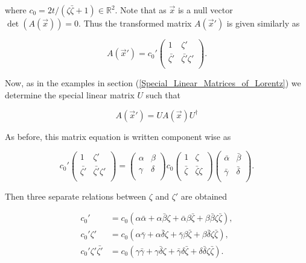 \noindent where $c_0 = 2t/(\zeta\bar{\zeta}+1) \in \mathbb{R}^2$. Note that as $\vec{x}$ is a null vector $\det{(A(\vec{x}))} = 0$. Thus the transformed matrix $A(\vec{x}')$ is given similarly as

\begin{equation*}
A(\vec{x}') = 
{c_0}'\left(
\begin{array}{cc}
1           & \zeta' \\ 
\bar{\zeta'} & \bar{\zeta'}\zeta' \\ 
\end{array}
\right).
\end{equation*}

\noindent Now, as in the examples in section (\ref{Special_Linear_Matrices_of_Lorentz}) we determine the special linear matrix $U$ such that

\begin{equation}\label{Ext_Complex_UAU}
A(\vec{x}') = U A(\vec{x}) U^{\dagger}
\end{equation}

\noindent As before, this matrix equation is written component wise as

\begin{equation*}
{c_0}'\left(
\begin{array}{cc}
1           & \zeta' \\ 
\bar{\zeta'} & \bar{\zeta'}\zeta' \\ 
\end{array}
\right)
=
\left(
\begin{array}{cc}
\alpha & \beta \\
\gamma & \delta \\
\end{array}
\right)
{c_0}\left(
\begin{array}{cc}
1           & \zeta \\ 
\bar{\zeta} & \bar{\zeta}\zeta \\ 
\end{array}
\right)
\left(
\begin{array}{cc}
\bar{\alpha} & \bar{\beta} \\
\bar{\gamma} & \bar{\delta} \\
\end{array}
\right).
\end{equation*}

\noindent Then three separate relations between $\zeta$ and $\zeta'$ are obtained

\begin{align}\label{Ext_Complex_zeta_trans_1} 
{c_0}' & = c_0 (\alpha \bar{\alpha} + \alpha \bar{\beta} \zeta + \bar{\alpha} \beta \bar{\zeta} + \beta \bar{\beta} \zeta \bar{\zeta}), \\\label{Ext_Complex_zeta_trans_2} 
{c_0}'\zeta' & = c_0 (\alpha \bar{\gamma} + \alpha \bar{\delta} \zeta + \bar{\gamma} \beta \bar{\zeta} + \beta \bar{\delta} \zeta \bar{\zeta}), \\\label{Ext_Complex_zeta_trans_3} 
{c_0}'\zeta'\bar{\zeta'} & = c_0 (\gamma \bar{\gamma} + \gamma \bar{\delta} \zeta + \bar{\gamma} \delta \bar{\zeta} + \delta \bar{\delta} \zeta \bar{\zeta}). 
\end{align} 

